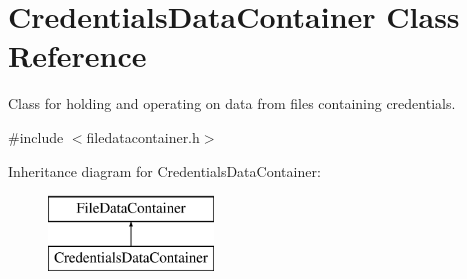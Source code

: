 \hypertarget{classCredentialsDataContainer}{}\section{Credentials\+Data\+Container Class Reference}
\label{classCredentialsDataContainer}


Class for holding and operating on data from files containing credentials.  




{\ttfamily \#include $<$filedatacontainer.\+h$>$}

Inheritance diagram for Credentials\+Data\+Container\+:\begin{figure}[H]
\begin{center}
\leavevmode
\includegraphics[height=2.000000cm]{classCredentialsDataContainer}
\end{center}
\end{figure}
